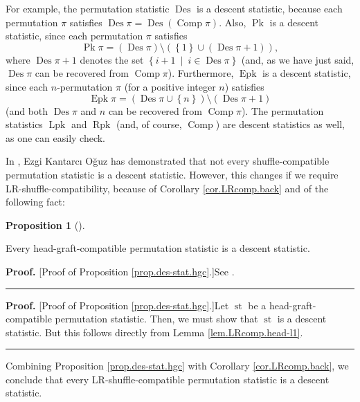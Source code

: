 \documentclass[numbers=enddot,12pt,final,onecolumn,notitlepage]{scrartcl}%
\theoremstyle{definition}
\newtheorem{prop}[theo]{Proposition}
\newenvironment{proposition}[1][]
{\begin{prop}[#1]\begin{leftbar}}
{\end{leftbar}\end{prop}}
\newenvironment{proof}[1][Proof]{\noindent\textbf{#1.} }{\ \rule{0.5em}{0.5em}}
\newenvironment{verlong}{}{}
\newenvironment{vershort}{}{}
\begin{document}
For example, the permutation statistic $\operatorname{Des}$ is a descent
statistic, because each permutation $\pi$ satisfies $\operatorname{Des}
\pi=\operatorname{Des}\left(  \operatorname*{Comp}\pi\right)  $. Also,
$\operatorname*{Pk}$ is a descent statistic, since each permutation $\pi$
satisfies%
\[
\operatorname*{Pk}\pi=\left(  \operatorname{Des}\pi\right)  \setminus\left(
\left\{  1\right\}  \cup\left(  \operatorname{Des}\pi+1\right)  \right)  ,
\]
where $\operatorname{Des}\pi+1$ denotes the set $\left\{  i+1\ \mid
\ i\in\operatorname{Des}\pi\right\}  $ (and, as we have just said,
$\operatorname{Des}\pi$ can be recovered from $\operatorname*{Comp}\pi$).
Furthermore, $\operatorname{Epk}$ is a descent statistic, since each
$n$-permutation $\pi$ (for a positive integer $n$) satisfies%
\[
\operatorname{Epk}\pi=\left(  \operatorname{Des}\pi\cup\left\{  n\right\}
\right)  \setminus\left(  \operatorname{Des}\pi+1\right)
\]
(and both $\operatorname{Des}\pi$ and $n$ can be recovered from
$\operatorname*{Comp}\pi$). The permutation statistics $\operatorname*{Lpk}$
and $\operatorname*{Rpk}$ (and, of course, $\operatorname*{Comp}$) are descent
statistics as well, as one can easily check.

In \cite[Corollary 1.6]{Oguz18}, Ezgi Kantarc{\i} O\u{g}uz has demonstrated that
not every shuffle-compatible permutation statistic is a descent statistic.
However, this changes if we require LR-shuffle-compatibility, because of
Corollary \ref{cor.LRcomp.back} and of the following fact:

\begin{proposition}
\label{prop.des-stat.hgc}Every head-graft-compatible permutation statistic is
a descent statistic.
\end{proposition}

\begin{vershort}
\begin{proof}
[Proof of Proposition \ref{prop.des-stat.hgc}.]See \cite{verlong}.
\end{proof}
\end{vershort}

\begin{verlong}
\begin{proof}
[Proof of Proposition \ref{prop.des-stat.hgc}.]Let $\operatorname{st}$ be a
head-graft-compatible permutation statistic. Then, we must show that
$\operatorname{st}$ is a descent statistic. But this follows directly from
Lemma \ref{lem.LRcomp.head-l1}.
\end{proof}

Combining Proposition \ref{prop.des-stat.hgc} with Corollary
\ref{cor.LRcomp.back}, we conclude that every LR-shuffle-compatible
permutation statistic is a descent statistic.
\end{verlong}
\end{document}
